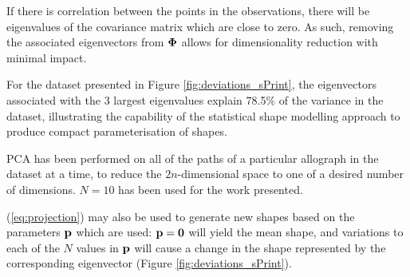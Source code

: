 \documentclass{sig-alternate}
\begin{document}
If there is correlation between the points in the observations, there will be
eigenvalues of the covariance matrix which are close to zero. As such, removing
the associated eigenvectors from ${\bf \Phi}$ allows for dimensionality
reduction with minimal impact. 
%

For the dataset presented in Figure \ref{fig:deviations_sPrint}, the
eigenvectors associated with the 3 largest eigenvalues explain 78.5\% of the
variance in the dataset, illustrating the capability of the statistical shape
modelling approach to produce compact parameterisation of shapes. 

%
%
PCA has been performed on all of the paths of a particular allograph in the
dataset at a time, to reduce the $2n$-dimensional space to one of a desired
number of dimensions. $N=10$ has been used for the work presented.

(\ref{eq:projection}) may also be used
to generate new shapes based on the parameters ${\bf p}$ which are used: ${\bf
p}={\bf 0}$ will yield the mean shape, and variations to each of the $N$ values
in ${\bf p}$ will cause a change in the shape represented by the corresponding
eigenvector (Figure \ref{fig:deviations_sPrint}). 
\end{document}
